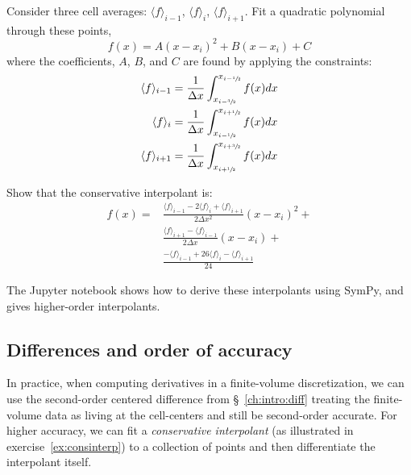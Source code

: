 \begin{exercise}
{\label{ex:consinterp} 

Consider three cell averages: $\langle f \rangle_{i-1}$, $\langle f \rangle_{i}$, $\langle f \rangle_{i+1}$.  Fit a quadratic polynomial through these points,
 \begin{equation}
 f(x) = A (x - x_i)^2 + B (x - x_i) + C
 \end{equation}
 where the coefficients, $A$, $B$, and $C$ are found by applying the constraints:
 \begin{align}
 \langle f\rangle_{i-1} &= \frac{1}{\Delta x}
      \int_{x_{i-\sfrac{3}{2}}}^{x_{i-{\sfrac{1}{2}}}} f(x) dx \\
 \langle f\rangle_{i} &= \frac{1}{\Delta x}
      \int_{x_{i-{\sfrac{1}{2}}}}^{x_{i+{\sfrac{1}{2}}}} f(x) dx \\
 \langle f\rangle_{i+1} &= \frac{1}{\Delta x}
      \int_{x_{i+{\sfrac{1}{2}}}}^{x_{i+\sfrac{3}{2}}} f(x) dx
 \end{align}

Show that the conservative interpolant is:
\begin{align}
f(x) = &\frac{\langle f\rangle_{i-1} - 2 \langle f\rangle_i +
             \langle f\rangle_{i+1}}{2\Delta x^2} (x-x_i)^2 + \nonumber \\
       &\frac{\langle f\rangle_{i+1} - \langle f\rangle_{i-1}}
            {2\Delta x} (x-x_i) + \nonumber \\
       &\frac{-\langle f\rangle_{i-1} + 26 \langle f\rangle_i
             -\langle f\rangle_{i+1}}{24}
\end{align}
}
\end{exercise}

The {\sf Jupyter} notebook
shows how to derive these interpolants using {\sf SymPy}, and gives
higher-order interpolants.


\subsection{Differences and order of accuracy}

In practice, when computing derivatives in a finite-volume
discretization, we can use the second-order centered difference from
\S~\ref{ch:intro:diff} treating the finite-volume data as living at the
cell-centers and still be second-order accurate.  For higher accuracy,
we can fit a {\em conservative interpolant} (as illustrated in
exercise~\ref{ex:consinterp}) to a collection of points and then
differentiate the interpolant itself.  

